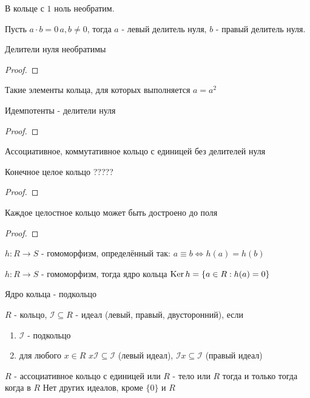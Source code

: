 \documentclass[../main/document.tex]{subfiles}
\begin{document}
\begin{cnsq}
В кольце с $1$ ноль необратим.
\end{cnsq}
\begin{dfn}
Пусть $a\cdot b=0\, a,b\neq 0$, тогда $a$ - левый делитель нуля, $b$ - правый делитель нуля.
\end{dfn}
\begin{exm}

\end{exm}
\begin{thm}
Делители нуля необратимы
\begin{proof}

\end{proof}
\end{thm}
\begin{dfn}
Такие элементы кольца, для которых выполняется $a=a^2$
\end{dfn}
\begin{thm}
Идемпотенты - делители нуля
\begin{proof}

\end{proof}
\end{thm}
\begin{dfn}
Ассоциативное, коммутативное кольцо с единицей без делителей нуля
\end{dfn}
\begin{thm}
Конечное целое кольцо ?????
\begin{proof}

\end{proof}
\end{thm}
\begin{thm}
Каждое целостное кольцо может быть достроено до поля
\begin{proof}

\end{proof}
\end{thm}
\begin{dfn}
$h:R\to S$ - гомоморфизм, определённый так: $a\equiv b\Leftrightarrow h(a)=h(b)$
\end{dfn}
\begin{dfn}
$h:R\to S$ - гомоморфизм, тогда ядро кольца $\operatorname{Ker} h=\{a\in R:h(a)=0\}$ 
\end{dfn}
\begin{thm}
Ядро кольца - подкольцо
\end{thm}
\begin{dfn}[Идеал]
$R$ - кольцо, $\mathcal{I}\subseteq R$ - идеал (левый, правый, двусторонний), если
\begin{enumerate}
\item $\mathcal{I}$ - подкольцо
\item для любого $x\in R$ $x\mathcal{I}\subseteq\mathcal{I}$ (левый идеал), $\mathcal{I} x\subseteq\mathcal{I}$ (правый идеал)
\end{enumerate}
\end{dfn}
\begin{exm}

\end{exm}
\begin{thm}
$R$ - ассоциативное кольцо с единицей или $R$ - тело или $R$ тогда и только тогда когда в $R$ Нет других идеалов, кроме $\{0\}$ и $R$
\end{thm}
\begin{dfn}

\end{dfn}
\end{document}

